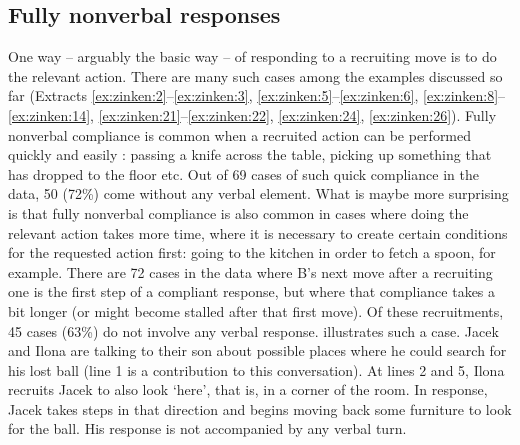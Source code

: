 \documentclass[output=paper]{langsci/langscibook}
\begin{document}
\subsection{Fully nonverbal responses}
\largerpage
One way -- arguably the basic way -- of responding to a recruiting move is to do the relevant action.  There are many such cases among the examples discussed so far (Extracts
\ref{ex:zinken:2}--\ref{ex:zinken:3},
\ref{ex:zinken:5}--\ref{ex:zinken:6},
\ref{ex:zinken:8}--\ref{ex:zinken:14},
\ref{ex:zinken:21}--\ref{ex:zinken:22},
\ref{ex:zinken:24}, \ref{ex:zinken:26}).
Fully nonverbal compliance is common when a recruited action can be performed quickly and easily \citep{RauniomaaKeisanen2012}: passing a knife across the table, picking up something that has dropped to the floor etc.  Out of 69 cases of such quick compliance in the data, 50 (72\%) come without any verbal element.  What is maybe more surprising is that fully nonverbal compliance is also common in cases where doing the relevant action takes more time, where it is necessary to create certain conditions for the requested action first: going to the kitchen in order to fetch a spoon, for example.  There are 72 cases in the data where B’s next move after a recruiting one is the first step of a compliant response, but where that compliance takes a bit longer (or might become stalled after that first move).  Of these recruitments, 45 cases (63\%) do not involve any verbal response.  illustrates such a case.  Jacek and Ilona are talking to their son about possible places where he could search for his lost ball (line 1 is a contribution to this conversation).  At lines 2 and 5, Ilona recruits Jacek to also look ‘here’, that is, in a corner of the room.  In response, Jacek takes steps in that direction and begins moving back some furniture to look for the ball.  His response is not accompanied by any verbal turn.
\end{document}
